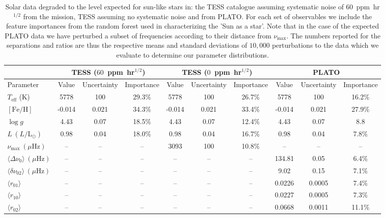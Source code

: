{\begin{landscape}
\begin{figure}
\end{figure}
\begin{table} %
\centering
\caption{Solar data degraded to the level expected for sun-like stars in: the TESS catalogue assuming systematic  noise of $60$~ppm~hr$^{1/2}$ from the mission, TESS assuming no systematic noise and from PLATO. For each set of observables we include the feature importances from the random forest used in characterizing the 'Sun as a star'. Note that in the case of the expected PLATO data we have perturbed a subset of frequencies according to their distance from $\nu_{\max}$. The numbers reported for the separations and ratios are thus the respective means and standard deviations of $10,000$ perturbations to the data which we evaluate to determine our parameter distributions. \label{tab:tpl}} 
\begin{tabular}{l|ccc|ccc|ccc}
\multicolumn{1}{c}{} &
\multicolumn{3}{c}{TESS ($60$~ppm~hr$^{1/2}$)}   &
\multicolumn{3}{|c|}{TESS ($0$~ppm~hr$^{1/2}$)}   &
\multicolumn{3}{c}{PLATO} \\\hline
Parameter  &
Value &
Uncertainty &  
Importance &
Value &
Uncertainty &
Importance &
Value &
Uncertainty &
Importance \\\hline
$T_{\text{eff}}$ (K) & 5778 &100 &29.3\% & 5778 &100 &26.7\%& 5778 &100 &16.2\%\\
$[\text{Fe/H}]$ &-0.014 &0.021 &34.3\% &-0.014 &0.021 &33.4\% &-0.014 &0.021 &27.9\%\\
$\log{} g$ &4.43 &0.07 &18.5\% &4.43 &0.07 &12.4\% &4.43 &0.07 &8.8\\
$L \ (L/\text{L}_{\odot})$   &0.98  &0.04 &18.0\% &0.98  &0.04  &16.7\% &0.98  &0.04  &7.8\%\\
$\nu_{\max} \ (\mu \text{Hz})$  & -- & -- & -- &3093 &100 &10.8\% & -- &-- & --\\
$\langle\Delta\nu_0\rangle  \ (\mu \text{Hz})$  & -- & -- & -- & -- & -- & -- &134.81 &0.05 &6.4\%\\
$\langle\delta\nu_{02}\rangle  \ (\mu \text{Hz})$  & -- & -- & -- & -- & -- & -- &9.02 &0.15 &7.1\% \\
$\langle r_{01}\rangle$ & -- & -- & -- & -- & -- & -- &0.0226 &0.0005 &7.4\%\\
$\langle r_{10}\rangle$ & -- & -- & -- & -- & -- & -- &0.0227 &0.0005 &7.3\% \\
$\langle r_{02}\rangle$& -- & -- & -- & -- & -- & -- &0.0668 &0.0011 & 11.1\%
\end{tabular}
\end{table}
\end{landscape}
}


